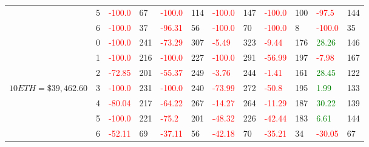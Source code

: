 \begin{table}[htb!]
\begin{adjustwidth}{-0.9in}{-0.9in}
\begin{tabular}{|p{5em}|p{2em}|p{3em}|p{3em}|p{3em}|p{3em}|p{3em}|p{3em}|p{3em}|p{3em}|p{3em}|p{3em}|}
            & 5 & \textcolor{red}{-100.0} & 67 & \textcolor{red}{-100.0} & 114 & \textcolor{red}{-100.0} & 147 & \textcolor{red}{-100.0} & 100 & \textcolor{red}{-97.5} & 144\\\cline{3-12}
            & 6 & \textcolor{red}{-100.0} & 37 & \textcolor{red}{-96.31} & 56 & \textcolor{red}{-100.0} & 70 & \textcolor{red}{-100.0} & 8 & \textcolor{red}{-100.0} & 35\\\hline\hline
            & 0 & \textcolor{red}{-100.0} & 241 & \textcolor{red}{-73.29} & 307 & \textcolor{red}{-5.49} & 323 & \textcolor{red}{-9.44} & 176 & \textcolor{green}{28.26} & 146\\\cline{3-12}
            & 1 & \textcolor{red}{-100.0} & 216 & \textcolor{red}{-100.0} & 227 & \textcolor{red}{-100.0} & 291 & \textcolor{red}{-56.99} & 197 & \textcolor{red}{-7.98} & 167\\\cline{3-12}
            & 2 & \textcolor{red}{-72.85} & 201 & \textcolor{red}{-55.37} & 249 & \textcolor{red}{-3.76} & 244 & \textcolor{red}{-1.41} & 161 & \textcolor{green}{28.45} & 122\\\cline{3-12}
            $10 ETH = \$39,462.60$ & 3 & \textcolor{red}{-100.0} & 231 & \textcolor{red}{-100.0} & 240 & \textcolor{red}{-73.99} & 272 & \textcolor{red}{-50.8} & 195 & \textcolor{green}{1.99} & 133\\[-3ex]\cline{3-12}
            & 4 & \textcolor{red}{-80.04} & 217 & \textcolor{red}{-64.22} & 267 & \textcolor{red}{-14.27} & 264 & \textcolor{red}{-11.29} & 187 & \textcolor{green}{30.22} & 139\\\cline{3-12}
            & 5 & \textcolor{red}{-100.0} & 221 & \textcolor{red}{-75.2} & 201 & \textcolor{red}{-48.32} & 226 & \textcolor{red}{-42.44} & 183 & \textcolor{green}{6.61} & 144\\\cline{3-12}
            & 6 & \textcolor{red}{-52.11} & 69 & \textcolor{red}{-37.11} & 56 & \textcolor{red}{-42.18} & 70 & \textcolor{red}{-35.21} & 34 & \textcolor{red}{-30.05} & 67\\\hline\hline


\end{tabular}
\end{adjustwidth}
\end{table}
